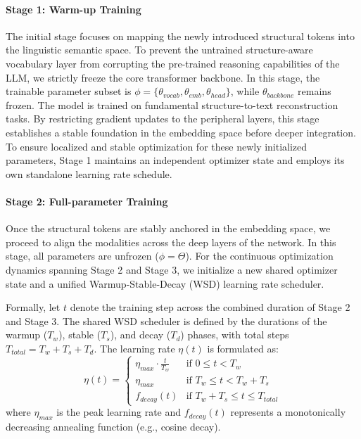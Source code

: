 \paragraph{Stage 1: Warm-up Training}
The initial stage focuses on mapping the newly introduced structural tokens into the linguistic semantic space. To prevent the untrained structure-aware vocabulary layer from corrupting the pre-trained reasoning capabilities of the LLM, we strictly freeze the core transformer backbone. 
In this stage, the trainable parameter subset is $\phi = \{\theta_{vocab}, \theta_{emb}, \theta_{head}\}$, while $\theta_{backbone}$ remains frozen. The model is trained on fundamental structure-to-text reconstruction tasks. By restricting gradient updates to the peripheral layers, this stage establishes a stable foundation in the embedding space before deeper integration. To ensure localized and stable optimization for these newly initialized parameters, Stage 1 maintains an independent optimizer state and employs its own standalone learning rate schedule.

\paragraph{Stage 2: Full-parameter Training}
Once the structural tokens are stably anchored in the embedding space, we proceed to align the modalities across the deep layers of the network. In this stage, all parameters are unfrozen ($\phi = \Theta$). For the continuous optimization dynamics spanning Stage 2 and Stage 3, we initialize a new shared optimizer state and a unified Warmup-Stable-Decay (WSD) learning rate scheduler. 

Formally, let $t$ denote the training step across the combined duration of Stage 2 and Stage 3. The shared WSD scheduler is defined by the durations of the warmup ($T_{w}$), stable ($T_{s}$), and decay ($T_{d}$) phases, with total steps $T_{total} = T_{w} + T_{s} + T_{d}$. The learning rate $\eta(t)$ is formulated as:
\begin{equation}
    \eta(t) = \begin{cases}
        \eta_{max} \cdot \frac{t}{T_{w}} & \text{if } 0 \le t < T_{w} \\
        \eta_{max} & \text{if } T_{w} \le t < T_{w} + T_{s} \\
        f_{decay}(t) & \text{if } T_{w} + T_{s} \le t \le T_{total}
    \end{cases}
\end{equation}
where $\eta_{max}$ is the peak learning rate and $f_{decay}(t)$ represents a monotonically decreasing annealing function (e.g., cosine decay). 

